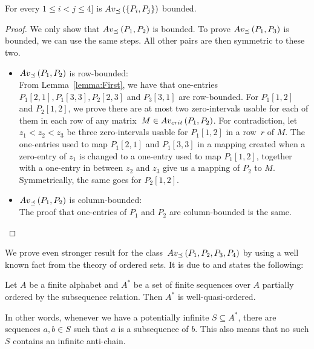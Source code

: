 \begin{thm}
For every $1\leq i<j\leq4]$ is $Av_{\preceq}\left(\{P_i,P_j\}\right)$ bounded.
\end{thm}
\begin{proof}
We only show that $Av_{\preceq}\left(P_1,P_2\right)$ is bounded. To prove $Av_{\preceq}\left(P_1,P_3\right)$ is bounded, we can use the same steps. All other pairs are then symmetric to these two.
\begin{itemize}
	\item $Av_{\preceq}\left(P_1,P_2\right)$ is row-bounded:\\
	From Lemma~\ref{lemma:First}, we have that one-entries $P_1[2,1],P_1[3,3],P_2[2,3]$ and $P_3[3,1]$ are row-bounded. For $P_1[1,2]$ and $P_2[1,2]$, we prove there are at most two zero-intervals usable for each of them in each row of any matrix~$M\in Av_{crit}\left(P_1,P_2\right)$. For contradiction, let $z_1<z_2<z_3$ be three zero-intervals usable for $P_1[1,2]$ in a row~$r$ of $M$. The one-entries used to map $P_1[2,1]$ and $P_1[3,3]$ in a mapping created when a zero-entry of $z_1$ is changed to a one-entry used to map $P_1[1,2]$, together with a one-entry in between $z_2$ and $z_3$ give us a mapping of $P_2$ to $M$. Symmetrically, the same goes for $P_2[1,2]$.
	\item $Av_{\preceq}\left(P_1,P_2\right)$ is column-bounded:\\
	The proof that one-entries of $P_1$ and $P_2$ are column-bounded is the same. \qedhere
\end{itemize}
\end{proof}

We prove even stronger result for the class~$Av_{\preceq}\left(P_1,P_2,P_3,P_4\right)$ by using a well known fact from the theory of ordered sets. It is due to \cite{higman} and states the following:

\begin{fct}
\label{fct:Higman}
Let $A$ be a finite alphabet and $A^*$ be a set of finite sequences over $A$ partially ordered by the subsequence relation. Then $A^*$ is well-quasi-ordered.
\end{fct}

In other words, whenever we have a potentially infinite $S\subseteq A^*$, there are sequences $a,b\in S$ such that $a$ is a subsequence of $b$. This also means that no such $S$ contains an infinite anti-chain.

